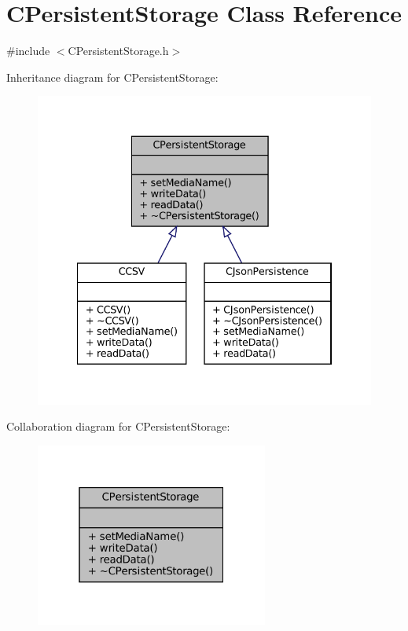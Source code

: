 \hypertarget{classCPersistentStorage}{}\section{C\+Persistent\+Storage Class Reference}
\label{classCPersistentStorage}


{\ttfamily \#include $<$C\+Persistent\+Storage.\+h$>$}



Inheritance diagram for C\+Persistent\+Storage\+:
\nopagebreak
\begin{figure}[H]
\begin{center}
\leavevmode
\includegraphics[width=334pt]{classCPersistentStorage__inherit__graph}
\end{center}
\end{figure}


Collaboration diagram for C\+Persistent\+Storage\+:
\nopagebreak
\begin{figure}[H]
\begin{center}
\leavevmode
\includegraphics[width=217pt]{classCPersistentStorage__coll__graph}
\end{center}
\end{figure}

